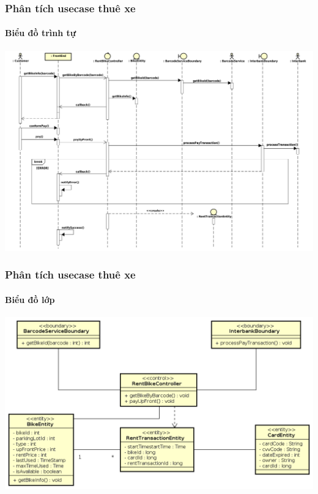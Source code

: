 \documentclass[11pt]{beamer}
\begin{document}
\begin{frame}[plain]
	\frametitle{Phân tích usecase thuê xe}
	\framesubtitle{Biểu đồ trình tự}
	\hspace*{-.1 in}\includegraphics[scale=.25]{Images/RentBike.png}
\end{frame}
\begin{frame}[plain]
	\frametitle{Phân tích usecase thuê xe}
	\framesubtitle{Biểu đồ lớp}
	\hspace*{-.1 in}\includegraphics[scale=.4]{Images/RentBikeClass.png}
\end{frame}
\end{document}
